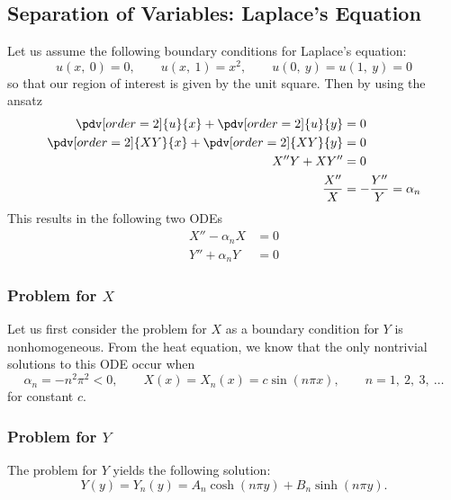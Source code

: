 \documentclass{article}
\begin{document}
\subsection{Separation of Variables: Laplace's Equation}
Let us assume the following boundary conditions for Laplace's equation:
\begin{equation*}
    u\left( x,\: 0 \right) = 0, \quad \quad u\left( x,\: 1 \right) = x^2, \quad \quad u\left( 0,\: y \right) = u\left( 1,\: y \right) = 0
\end{equation*}
so that our region of interest is given by the unit square.
Then by using the ansatz
\begin{align*}
    \pdv[order=2]{u}{x} + \pdv[order=2]{u}{y}   & = 0                          \\
    \pdv[order=2]{XY}{x} + \pdv[order=2]{XY}{y} & = 0                          \\
    X''Y + XY''                                 & = 0                          \\
    \frac{X''}{X}                               & = - \frac{Y''}{Y} = \alpha_n
\end{align*}
This results in the following two ODEs
\begin{align*}
    X'' - \alpha_n X & = 0 \\
    Y'' + \alpha_n Y & = 0
\end{align*}
\subsubsection{Problem for \texorpdfstring{\(X\)}{X}}
Let us first consider the problem for \(X\) as a boundary condition for
\(Y\) is nonhomogeneous.
From the heat equation, we know that the only nontrivial solutions to
this ODE occur when
\begin{equation*}
    \alpha_n = - n^2 \pi^2 < 0, \quad \quad X\left( x \right) = X_n\left( x \right) = c \sin{\left( n \pi x \right)}, \quad \quad n = 1,\: 2,\: 3,\: \dots
\end{equation*}
for constant \(c\).
\subsubsection{Problem for \texorpdfstring{\(Y\)}{Y}}
The problem for \(Y\) yields the following solution:
\begin{equation*}
    Y\left( y \right) = Y_n\left( y \right) = A_n \cosh{\left( n \pi y \right)} + B_n \sinh{\left( n \pi y \right)}.
\end{equation*}
\end{document}
